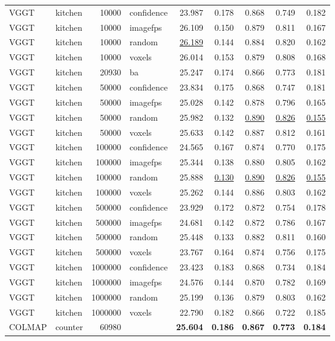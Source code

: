 \begin{table}[H]
\begin{tabular}{llrlrrrrr}
VGGT & kitchen & 10000 & confidence & 23.987 & 0.178 & 0.868 & 0.749 & 0.182 \\
VGGT & kitchen & 10000 & imagefps & 26.109 & 0.150 & 0.879 & 0.811 & 0.167 \\
VGGT & kitchen & 10000 & random & \underline{26.189} & 0.144 & 0.884 & 0.820 & 0.162 \\
VGGT & kitchen & 10000 & voxels & 26.014 & 0.153 & 0.879 & 0.808 & 0.168 \\
VGGT & kitchen & 20930 & ba & 25.247 & 0.174 & 0.866 & 0.773 & 0.181 \\
VGGT & kitchen & 50000 & confidence & 23.834 & 0.175 & 0.868 & 0.747 & 0.181 \\
VGGT & kitchen & 50000 & imagefps & 25.028 & 0.142 & 0.878 & 0.796 & 0.165 \\
VGGT & kitchen & 50000 & random & 25.982 & 0.132 & \underline{0.890} & \underline{0.826} & \underline{0.155} \\
VGGT & kitchen & 50000 & voxels & 25.633 & 0.142 & 0.887 & 0.812 & 0.161 \\
VGGT & kitchen & 100000 & confidence & 24.565 & 0.167 & 0.874 & 0.770 & 0.175 \\
VGGT & kitchen & 100000 & imagefps & 25.344 & 0.138 & 0.880 & 0.805 & 0.162 \\
VGGT & kitchen & 100000 & random & 25.888 & \underline{0.130} & \underline{0.890} & \underline{0.826} & \underline{0.155} \\
VGGT & kitchen & 100000 & voxels & 25.262 & 0.144 & 0.886 & 0.803 & 0.162 \\
VGGT & kitchen & 500000 & confidence & 23.929 & 0.172 & 0.872 & 0.754 & 0.178 \\
VGGT & kitchen & 500000 & imagefps & 24.681 & 0.142 & 0.872 & 0.786 & 0.167 \\
VGGT & kitchen & 500000 & random & 25.448 & 0.133 & 0.882 & 0.811 & 0.160 \\
VGGT & kitchen & 500000 & voxels & 23.767 & 0.164 & 0.874 & 0.756 & 0.175 \\
VGGT & kitchen & 1000000 & confidence & 23.423 & 0.183 & 0.868 & 0.734 & 0.184 \\
VGGT & kitchen & 1000000 & imagefps & 24.576 & 0.144 & 0.870 & 0.782 & 0.169 \\
VGGT & kitchen & 1000000 & random & 25.199 & 0.136 & 0.879 & 0.803 & 0.162 \\
VGGT & kitchen & 1000000 & voxels & 22.790 & 0.182 & 0.866 & 0.722 & 0.185 \\
\midrule
COLMAP & counter & 60980 &  & \textbf{25.604} & \textbf{0.186} & \textbf{0.867} & \textbf{0.773} & \textbf{0.184} \\

\end{tabular}
\end{table}
